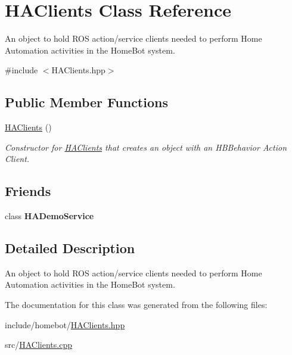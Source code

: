 \hypertarget{classHAClients}{\section{H\-A\-Clients Class Reference}
\label{classHAClients}
}


An object to hold R\-O\-S action/service clients needed to perform Home Automation activities in the Home\-Bot system.  




{\ttfamily \#include $<$H\-A\-Clients.\-hpp$>$}

\subsection*{Public Member Functions}
\begin{DoxyCompactItemize}
\item 
\hypertarget{classHAClients_a79d42d29e6e632c2875a37bc6651061b}{\hyperlink{classHAClients_a79d42d29e6e632c2875a37bc6651061b}{H\-A\-Clients} ()}\label{classHAClients_a79d42d29e6e632c2875a37bc6651061b}

\begin{DoxyCompactList}\small\item\em Constructor for \hyperlink{classHAClients}{H\-A\-Clients} that creates an object with an H\-B\-Behavior Action Client. \end{DoxyCompactList}\end{DoxyCompactItemize}
\subsection*{Friends}
\begin{DoxyCompactItemize}
\item 
\hypertarget{classHAClients_a54fd12ef3575018453406e028289eada}{class {\bfseries H\-A\-Demo\-Service}}\label{classHAClients_a54fd12ef3575018453406e028289eada}

\end{DoxyCompactItemize}


\subsection{Detailed Description}
An object to hold R\-O\-S action/service clients needed to perform Home Automation activities in the Home\-Bot system. 

The documentation for this class was generated from the following files\-:\begin{DoxyCompactItemize}
\item 
include/homebot/\hyperlink{HAClients_8hpp}{H\-A\-Clients.\-hpp}\item 
src/\hyperlink{HAClients_8cpp}{H\-A\-Clients.\-cpp}\end{DoxyCompactItemize}
